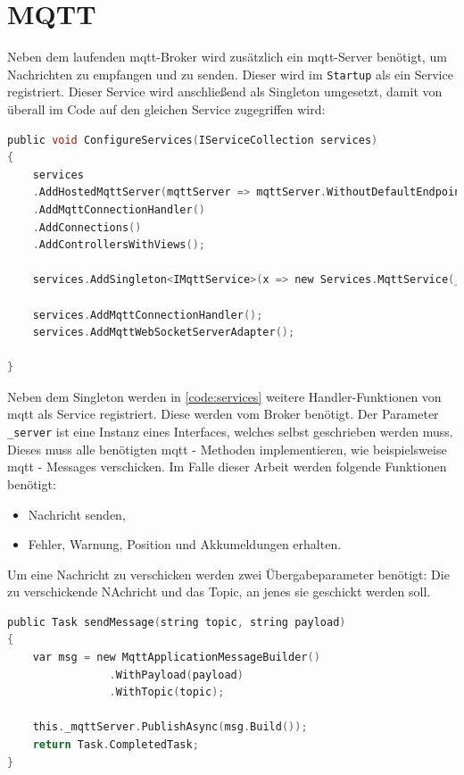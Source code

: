 \section{MQTT}
\label{sec:serverMqtt}
Neben dem laufenden \acrshort{mqtt}-Broker wird zusätzlich ein \acrshort{mqtt}-Server benötigt, um Nachrichten zu empfangen und zu senden. Dieser wird im \texttt{Startup} als ein Service registriert. Dieser Service wird anschließend als Singleton umgesetzt, damit von überall im Code auf den gleichen Service zugegriffen wird:

\begin{lstlisting}[language=c, style=dhpaperdefault]
public void ConfigureServices(IServiceCollection services)
{
	services
	.AddHostedMqttServer(mqttServer => mqttServer.WithoutDefaultEndpoint())
	.AddMqttConnectionHandler()
	.AddConnections()
	.AddControllersWithViews();

	services.AddSingleton<IMqttService>(x => new Services.MqttService(_server));

	services.AddMqttConnectionHandler();
	services.AddMqttWebSocketServerAdapter();

}
\end{lstlisting}

\vspace{0.5cm}
Neben dem Singleton werden in \autoref{code:services} weitere Handler-Funktionen von \acrshort{mqtt} als Service registriert. Diese werden vom Broker benötigt. Der Parameter \texttt{\_server} ist eine Instanz eines Interfaces, welches selbst geschrieben werden muss. Dieses muss alle benötigten \acrshort{mqtt} - Methoden implementieren, wie beispielsweise \acrshort{mqtt} - Messages verschicken. Im Falle dieser Arbeit werden folgende Funktionen benötigt:

\begin{center}
	\begin{itemize}
		\item Nachricht senden,
		\item Fehler, Warnung, Position und Akkumeldungen erhalten.
	\end{itemize}
\end{center}

Um eine Nachricht zu verschicken werden zwei Übergabeparameter benötigt: Die zu verschickende NAchricht und das Topic, an jenes sie geschickt werden soll. 
\newpage
\begin{lstlisting}[language=c, style=dhpaperdefault]
public Task sendMessage(string topic, string payload)
{
	var msg = new MqttApplicationMessageBuilder()
				.WithPayload(payload)
				.WithTopic(topic);

	this._mqttServer.PublishAsync(msg.Build());
	return Task.CompletedTask;
}
\end{lstlisting}

